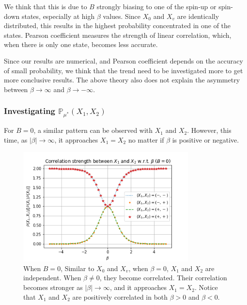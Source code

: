 \documentclass[12pt]{article}
\numberwithin{equation}{section}
\begin{document}
We think that this is due to $B$ strongly biasing to one of the spin-up or spin-down
states, especially at high $\beta$ values. Since $X_0$ and $X_v$ are identically distributed, this results in the highest probability concentrated in one of the states. Pearson coefficient measures the strength of linear correlation, which, when
there is only one state, becomes less accurate.

Since our results are numerical,
and Pearson coefficient depends on the accuracy of small probability, we think that
the trend need to be investigated more to get more conclusive results. The above theory
also does not explain the asymmetry between $\beta\rightarrow\infty$ and $\beta\rightarrow-\infty$.

\subsubsection{Investigating $\mathbb{P}_{\mu^*}(X_1, X_2)$}

For $B=0$, a similar pattern can be observed with $X_1$ and $X_2$. However, this time, as
$|\beta|\rightarrow\infty$, it approaches $X_1=X_2$ no matter if $\beta$ is positive or
negative.

\begin{figure}[h]
    \centering
    \includegraphics[width=9cm]{./img/ising_x1_x2.png}
    \caption{
        When $B=0$, Similar to $X_0$ and $X_v$, when $\beta=0$, $X_1$ and $X_2$ are independent.
        When $\beta\neq 0$, they become correlated. Their correlation becomes stronger
        as $|\beta|\rightarrow\infty$, and it approaches $X_1=X_2$. Notice that $X_1$ and $X_2$
        are positively correlated in both $\beta > 0$ and $\beta < 0$.}
    \label{Fig.ising-x1-x2}
\end{figure}
\end{document}
